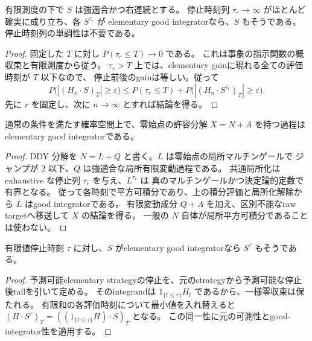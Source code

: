 \begin{lemma}
有限測度の下で $S$ は強適合かつ右連続とする。
停止時刻列 $\tau_r\to\infty$ がほとんど確実に成り立ち、各 $S^{\tau_r}$ が
elementary good integratorなら、$S$ もそうである。
停止時刻列の単調性は不要である。
\end{lemma}
\begin{proof}
固定した $T$ に対し $P(\tau_r\le T)\to0$ である。
これは事象の指示関数の概収束と有限測度から従う。
$\tau_r>T$ 上では、elementary gainに現れる全ての評価時刻が $T$ 以下なので、
停止前後のgainは等しい。従って
\[
 P\bigl(|(H_n\mathbin{\cdot}S)_T|\ge\varepsilon\bigr)
 \le P(\tau_r\le T)
 +P\bigl(|(H_n\mathbin{\cdot}S^{\tau_r})_T|\ge\varepsilon\bigr).
\]
先に $r$ を固定し、次に $n\to\infty$ とすれば結論を得る。
\end{proof}

\begin{proposition}
通常の条件を満たす確率空間上で、零始点の許容分解 $X=N+A$ を持つ過程は
elementary good integratorである。
\end{proposition}
\begin{proof}
DDY 分解を $N=L+Q$ と書く。$L$ は零始点の局所マルチンゲールで
ジャンプが $2$ 以下、$Q$ は強適合な局所有限変動過程である。
共通局所化は exhaustive な停止列 $\tau_r$ を与え、$L^{\tau_r}$ は
真のマルチンゲールかつ決定論的定数で有界となる。
従って各時刻で平方可積分であり、上の積分評価と局所化解除から $L$ はgood integratorである。
有限変動成分 $Q+A$ を加え、区別不能なraw targetへ移送して $X$ の結論を得る。
一般の $N$ 自体が局所平方可積分であることは使わない。
\end{proof}

\begin{lemma}
有限値停止時刻 $\tau$ に対し、$S$ がelementary good integratorなら $S^\tau$ もそうである。
\end{lemma}
\begin{proof}
予測可能elementary strategyの停止を、元のstrategyから予測可能な停止後tailを引いて定める。
そのintegrandは $1_{\{t\le\tau\}}H_t$ であるから、一様零収束は保たれる。
有限和の各評価時刻について最小値を入れ替えると
$(H\mathbin{\cdot}S^\tau)_T=((1_{\{t\le\tau\}}H)\mathbin{\cdot}S)_T$ となる。
この同一性に元の可測性とgood-integrator性を適用する。
\end{proof}

